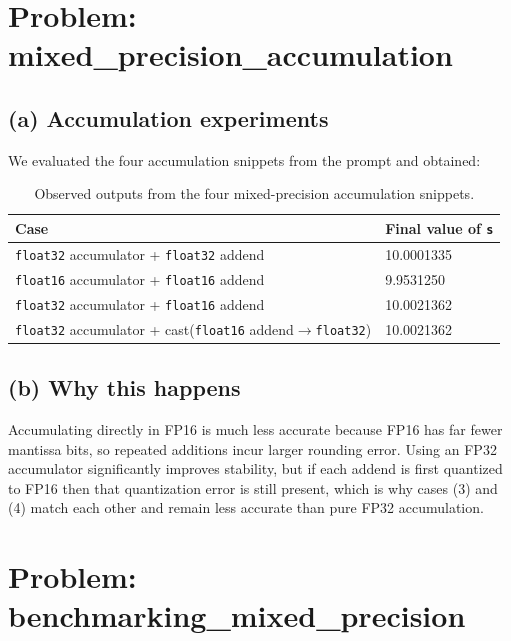 \documentclass[11pt]{article}
\begin{document}
\section{Problem: mixed\_precision\_accumulation}
\subsection*{(a) Accumulation experiments}
We evaluated the four accumulation snippets from the prompt and obtained:
\begin{table}[h]
\centering
\begin{tabular}{ll}
\toprule
Case & Final value of \texttt{s} \\
\midrule
\texttt{float32} accumulator + \texttt{float32} addend & 10.0001335 \\
\texttt{float16} accumulator + \texttt{float16} addend & 9.9531250 \\
\texttt{float32} accumulator + \texttt{float16} addend & 10.0021362 \\
\texttt{float32} accumulator + cast(\texttt{float16} addend$\rightarrow$\texttt{float32}) & 10.0021362 \\
\bottomrule
\end{tabular}
\caption{Observed outputs from the four mixed-precision accumulation snippets.}
\end{table}

\subsection*{(b) Why this happens}
Accumulating directly in FP16 is much less accurate because FP16 has far fewer mantissa bits, so repeated additions incur larger rounding error. Using an FP32 accumulator significantly improves stability, but if each addend is first quantized to FP16 then that quantization error is still present, which is why cases (3) and (4) match each other and remain less accurate than pure FP32 accumulation.

\section{Problem: benchmarking\_mixed\_precision}
\end{document}
